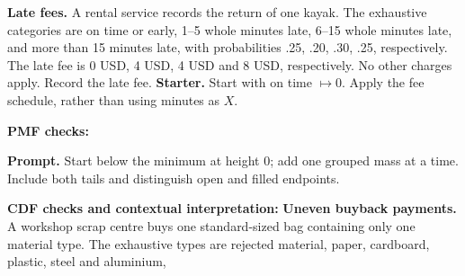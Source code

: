 \textbf{Late fees.} A rental service records the return of one kayak. The exhaustive categories are on time or
early, 1--5 whole minutes late, 6--15 whole minutes late, and more than 15 minutes late, with probabilities
.25, .20, .30, .25, respectively. The late fee is 0 USD, 4 USD, 4 USD and 8 USD, respectively. No other
charges apply. Record the late fee.
\textbf{Starter.} Start with on time $\mapsto0$. Apply the fee schedule, rather than using minutes as $X$.
\par%
\noindent%
\begin{minipage}[t]{.37\linewidth}%
  \vspace{0pt}\centering
\end{minipage}%
\hfill%
\begin{minipage}[t]{.60\linewidth}%
  \vspace{0pt}\centering
\end{minipage}%
\par
\textbf{PMF checks:} \hrulefill%
\par
{}
\textbf{Prompt.} Start below the minimum at height 0; add one grouped mass at a time. Include both tails and
distinguish open and filled endpoints.
\par%
\noindent%
\begin{minipage}[t]{.37\linewidth}%
  \vspace{0pt}\centering
\end{minipage}%
\hfill%
\begin{minipage}[t]{.60\linewidth}%
  \vspace{0pt}\centering
\end{minipage}%
\par
\textbf{CDF checks and contextual interpretation:}
\vfill
\clearpage
{}
\textbf{Uneven buyback payments.} A workshop scrap centre buys one standard-sized bag containing only one
material type. The exhaustive types are rejected material, paper, cardboard, plastic, steel and aluminium,
